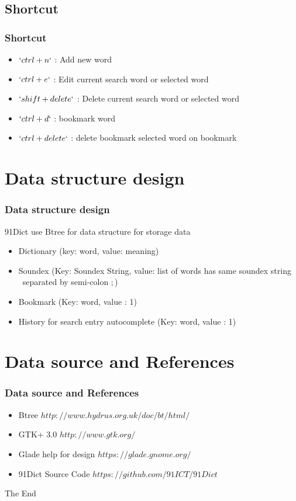 \subsection{Shortcut}
\begin{frame}
  \frametitle{Shortcut}
  \begin{itemize}
    \item $`ctrl + n`$       : Add new word
    \item $`ctrl + e`$     : Edit current search word or selected word  
    \item $`shift + delete`$ :  Delete current search word or selected word
    \item $`ctrl + d`$    : bookmark word  
    \item $`ctrl + delete`$ : delete bookmark selected word on bookmark 
  \end{itemize}
\end{frame}

\section{Data structure design}

\begin{frame}
\frametitle{Data structure design}
91Dict use Btree for data structure for storage data
\begin{itemize}
  \item Dictionary (key: word, value: meaning)
  \item Soundex (Key: Soundex String, value: list of words has same soundex string \
separated by semi-colon $;$)
  \item Bookmark (Key: word, value : 1)
  \item History for search entry autocomplete (Key: word, value : 1)
\end{itemize}
\end{frame}


\section{Data source and References}
\begin{frame}
\frametitle{Data source and References}
\begin{itemize}
  \item Btree $http://www.hydrus.org.uk/doc/bt/html/$
  \item GTK+ 3.0 $http://www.gtk.org/$
  \item Glade help for design $https://glade.gnome.org/$
  \item 91Dict Source Code $https://github.com/91ICT/91Dict$
\end{itemize}
\end{frame}

\begin{frame}
\Huge{\centerline{The End}}
\end{frame}
